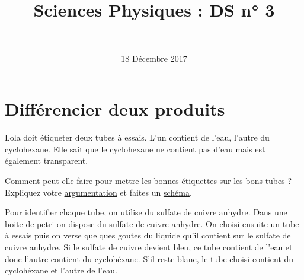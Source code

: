 \documentclass[a4paper,11pt]{exam}
\author{\ }
\date{18 Décembre 2017}
\title{Sciences Physiques : DS n° 3}
\begin{document}
%	

	\maketitle
	
	



\section{Différencier deux produits}

Lola doit étiqueter deux tubes à essais. L'un contient de l'eau, l'autre du cyclohexane. Elle sait que le cyclohexane ne contient pas d'eau mais est également transparent.

\begin{questions}
	\question Comment peut-elle faire pour mettre les bonnes étiquettes sur les bons tubes ? Expliquez votre \underline{argumentation} et faites un \underline{schéma}.
	
	\begin{solution}
		Pour identifier chaque tube, on utilise du sulfate de cuivre anhydre. Dans une boite de petri on dispose du sulfate de cuivre anhydre. On choisi ensuite un tube à essais puis on verse quelques goutes du liquide qu'il contient sur le sulfate de cuivre anhydre. Si le sulfate de cuivre devient bleu, ce tube contient de l'eau et donc l'autre contient du cyclohéxane. S'il reste blanc, le tube choisi contient du cyclohéxane et l'autre de l'eau.
	\end{solution}
\end{questions}
\end{document}
